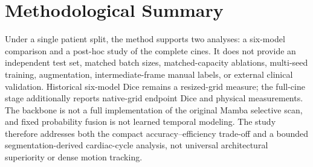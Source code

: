 \section{Methodological Summary}
Under a single patient split, the method supports two analyses: a six-model comparison and a post-hoc study of the complete cines. It does not provide an independent test set, matched batch sizes, matched-capacity ablations, multi-seed training, augmentation, intermediate-frame manual labels, or external clinical validation. Historical six-model Dice remains a resized-grid measure; the full-cine stage additionally reports native-grid endpoint Dice and physical measurements. The backbone is not a full implementation of the original Mamba selective scan, and fixed probability fusion is not learned temporal modeling. The study therefore addresses both the compact accuracy--efficiency trade-off and a bounded segmentation-derived cardiac-cycle analysis, not universal architectural superiority or dense motion tracking.
